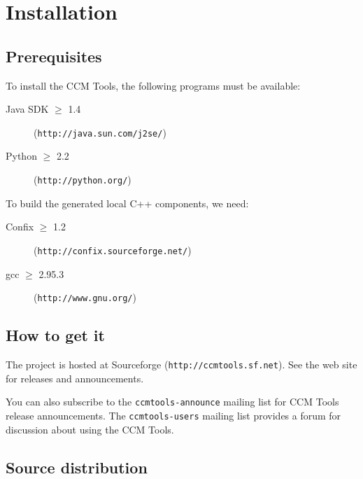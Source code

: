 
\chapter{Installation}

\section{Prerequisites}

To install the CCM Tools, the following programs must be available:
\begin{description}
\item [Java SDK $\ge$ 1.4] ({\tt http://java.sun.com/j2se/})
\item [Python $\ge$ 2.2] ({\tt http://python.org/})
\end{description}

To build the generated local C++ components, we need:
\begin{description}
\item [Confix $\ge$ 1.2] ({\tt http://confix.sourceforge.net/})
\item [gcc $\ge$ 2.95.3] ({\tt http://www.gnu.org/})
\end{description}


\section{How to get it}

The project is hosted at Sourceforge ({\tt http://ccmtools.sf.net}). See the web
site for releases and announcements.

You can also subscribe to the {\tt ccmtools-announce} mailing list for CCM Tools
release announcements. The {\tt ccmtools-users} mailing list provides a forum
for discussion about using the CCM Tools.

\section{Source distribution}

